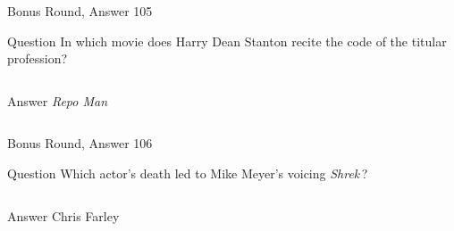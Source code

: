 \documentclass[11pt]{beamer}
\begin{document}
\begin{frame}[t]{Bonus Round, Answer 105}
\vspace{2em}
\begin{block}{Question}
In which movie does Harry Dean Stanton recite the code of the titular profession?
\end{block}
\pause{}
\begin{columns}[T,totalwidth=\linewidth]
\begin{column}{0.35\linewidth}
\begin{block}{Answer}
\emph{Repo Man}
\end{block}
\end{column}
\begin{column}{0.6\linewidth}
\begin{center}
\texttt{[image: \{Images/repo man]}.jpeg}
\end{center}
\end{column}
\end{columns}
\end{frame}
    

\begin{frame}[t]{Bonus Round, Answer 106}
\vspace{2em}
\begin{block}{Question}
Which actor's death led to Mike Meyer's voicing \emph{Shrek}\,?
\end{block}
\pause{}
\begin{columns}[T,totalwidth=\linewidth]
\begin{column}{0.35\linewidth}
\begin{block}{Answer}
Chris Farley
\end{block}
\end{column}
\begin{column}{0.6\linewidth}
\begin{center}
\texttt{[image: \{Images/farley]}.jpg}
\end{center}
\end{column}
\end{columns}
\end{frame}
    
\end{document}
